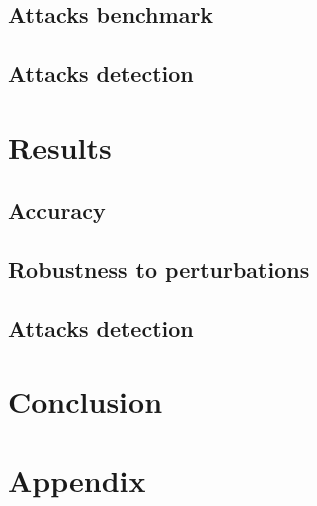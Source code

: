 \documentclass[11pt,twocolumn,letterpaper]{article}
\begin{document}
\subsection{Attacks benchmark}

\paragraph{} 

\subsection{Attacks detection}

\paragraph{}


\section{Results}
\label{sec:results}

\subsection{Accuracy}

\paragraph{} 

\subsection{Robustness to perturbations}

\paragraph{} 

\subsection{Attacks detection}

\paragraph{} 


\section{Conclusion}
\label{sec:conclusion}


\section{Appendix}
\label{sec:appendix}

{\small


}
\end{document}
